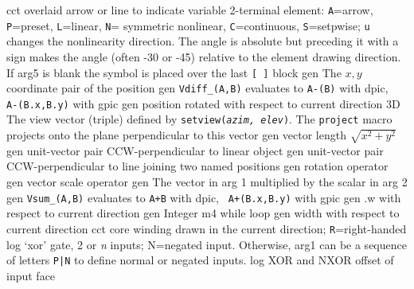   {cct}
  {overlaid arrow or line to indicate variable 2-terminal element:
    {\tt A}=arrow, {\tt P}=preset, {\tt L}=linear, {\tt N}= symmetric
    nonlinear, {\tt C}=continuous, {\tt S}=setpwise; {\tt u} changes
    the nonlinearity direction.  The angle is absolute but preceding
    it with a sign makes the angle (often -30 or -45) relative to the
    element drawing direction.  If arg5 is blank the symbol is placed
    over the last {\tt [ ]} block
   }
  {gen}
  {The $x, y$ coordinate pair of the position}
  {gen}
  {{\tt Vdiff\_(A,B)} evaluates to {\tt A-(B)} with dpic, {\tt
  A-(B.x,B.y)}
   with gpic}
  {gen}
  {position rotated with respect to current direction}
  {3D} {The view vector (triple) defined by {\tt setview({\sl azim,
  elev})}. The
   {\tt project} macro projects onto the plane perpendicular to this
   vector}
  {gen}
  {vector length $\sqrt{x^2+y^2}$}
  {gen}
  {unit-vector pair CCW-perpendicular to linear object}
  {gen}
  {unit-vector pair CCW-perpendicular to line joining two named
  positions}
  {gen}
  {rotation operator}
  {gen}
  {vector scale operator}
  {gen}
  {The vector in arg 1 multiplied by the scalar in arg 2}
  {gen}
  {{\tt Vsum\_(A,B)} evaluates to {\tt A+B} with dpic, {\tt
  A+(B.x,B.y)}
   with gpic}
%
  {gen}
  {.w with respect to current direction}
  {gen}
  {Integer m4 while loop}
  {gen}
  {width with respect to current direction}
  {cct}
  {core winding drawn in the current direction; {\tt R}=right-handed
   }
  {log}
  {`xor' gate, 2 or {\sl n\/} inputs; N=negated input.
   Otherwise, arg1 can be a sequence of letters {\tt P|N} to define
   normal or negated inputs.
    }
  {log}
  {XOR and NXOR offset of input face}
